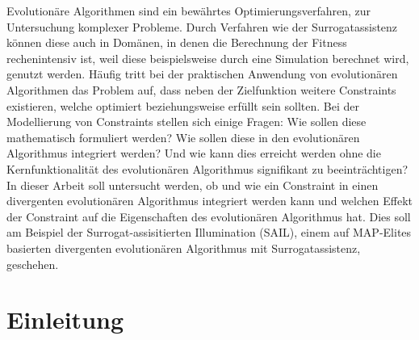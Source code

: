 Evolutionäre Algorithmen sind ein bewährtes Optimierungsverfahren, zur Untersuchung komplexer Probleme.
Durch Verfahren wie der Surrogatassistenz können diese auch in Domänen, in denen die Berechnung der Fitness rechenintensiv ist, weil diese beispielsweise durch eine Simulation berechnet wird, genutzt werden.
Häufig tritt bei der praktischen Anwendung von evolutionären Algorithmen das Problem auf, dass neben der Zielfunktion weitere Constraints existieren, welche optimiert beziehungsweise erfüllt sein sollten.
Bei der Modellierung von Constraints stellen sich einige Fragen:
Wie sollen diese mathematisch formuliert werden? 
Wie sollen diese in den evolutionären Algorithmus integriert werden?
Und wie kann dies erreicht werden ohne die Kernfunktionalität des evolutionären Algorithmus signifikant zu beeinträchtigen?
In dieser Arbeit soll untersucht werden, ob und wie ein Constraint in einen divergenten evolutionären Algorithmus integriert werden kann und welchen Effekt der Constraint auf die Eigenschaften des evolutionären Algorithmus hat.
Dies soll am Beispiel der Surrogat-assisitierten Illumination (SAIL), einem auf MAP-Elites basierten divergenten evolutionären Algorithmus mit Surrogatassistenz, geschehen.

\section{Einleitung}

